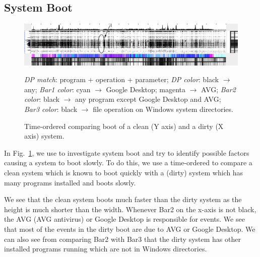 \subsection{System Boot}
\label{sec:boot}

\begin{figure}[htb]
\includegraphics[width=1.0\textwidth]{lviz/boot-dp.png}
\caption{Time-ordered \VDP{} comparing boot
of a clean (Y axis) and a dirty (X axis) system.
}
\label{fig:boot-dp}
{\it DP match}: program + operation + parameter;
{\it DP color}: black $\rightarrow$ any;
{\it Bar1 color}: cyan $\rightarrow$ Google Desktop; magenta $\rightarrow$ AVG;
{\it Bar2 color}: black $\rightarrow$ any program except Google Desktop and AVG;
{\it Bar3 color}: black $\rightarrow$ file operation on Windows system directories.
\end{figure}

In Fig.~\ref{fig:boot-dp}, we use \lviz{} to investigate system boot and try to identify possible
factors causing a system to boot slowly.
To do this, we use a time-ordered \VDP{} to
compare a clean system which is known to boot quickly
with a (dirty) system which has many programs installed and boots slowly.

We see that the clean system boots much faster than the dirty system 
as the height is much shorter than the width.
Whenever Bar2 on the x-axis is not black,
the AVG (AVG antivirus) or Google Desktop is responsible for events.
We see that most of the events in the dirty boot are due to AVG or Google
Desktop.
We can also see from comparing Bar2 with Bar3
that the dirty system has other installed programs running
which are not in Windows directories.

